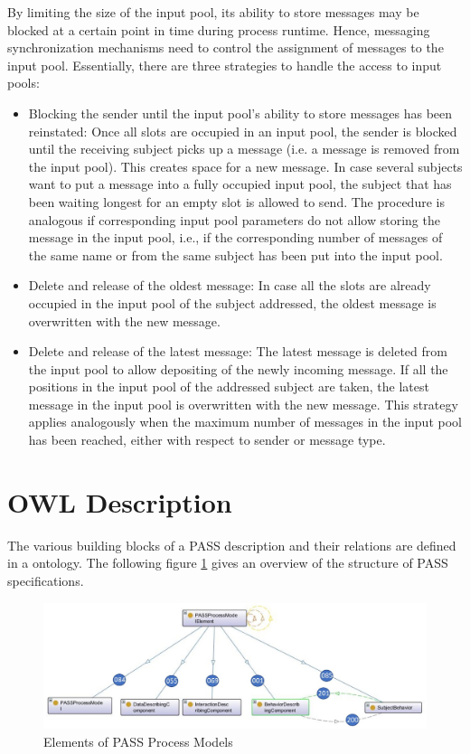 By limiting the size of the input pool, its ability to store messages may be blocked at a certain point in time during process runtime. Hence, messaging synchronization mechanisms need to control the assignment of messages to the input pool. Essentially, there are three strategies to handle the access to input pools:
\begin{itemize}
	\item Blocking the sender until the input pool’s ability to store messages has been reinstated: Once all slots are occupied in an input pool, the sender is blocked until the receiving subject picks up a message (i.e. a message is removed from the input pool). This creates space for a new message. In case several subjects want to put a message into a fully occupied input pool, the subject that has been waiting longest for an empty slot is allowed to send. The procedure is analogous if corresponding input pool parameters do not allow storing the message in the input pool, i.e., if the corresponding number of messages of the same name or from the same subject has been put into the input pool.
	\item Delete and release of the oldest message: In case all the slots are already occupied in the input pool of the subject addressed, the oldest message is overwritten with the new message.
	\item Delete and release of the latest message: The latest message is deleted from the input pool to allow depositing of the newly incoming message. If all the positions in the input pool of the addressed subject are taken, the latest message in the input pool is overwritten with the new message. This strategy applies analogously when the maximum number of messages in the input pool has been reached, either with respect to sender or message type.
\end{itemize}

\newpage

\section{OWL Description}

The various building blocks of a PASS description and their relations are defined in a ontology. The following figure \ref{fig:20171217-passprocessmodellelement} gives an overview of the structure of PASS specifications.   

\begin{figure}[ph]
	\centering
	\includegraphics[width=0.9\linewidth]{20181026-Ontologie-Bilder/Grafiken-Ontologie/SUbject-Interaction/20171217-PASSProcessModellElement}
	\caption[Elements of PASS Process Models]{Elements of PASS Process Models}
	\label{fig:20171217-passprocessmodellelement}
\end{figure}

